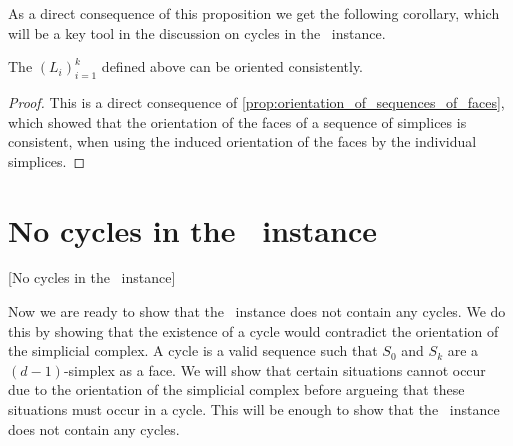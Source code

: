 As a direct consequence of this proposition we get the following corollary, which will be a key tool in the discussion on cycles in the \EndOfLine\ instance.

\begin{corollary}
    The $\left(L_i\right)_{i=1}^{k}$ defined above can be oriented consistently.
\end{corollary}
\begin{proof}
    This is a direct consequence of \cref{prop:orientation_of_sequences_of_faces}, which showed that the orientation of the faces of a sequence of simplices is consistent, when using the induced orientation of the faces by the individual simplices.
\end{proof}

\section{No cycles in the \EndOfLine\ instance}[No cycles in the \EndOfLine\ instance]

Now we are ready to show that the \EndOfLine\ instance does not contain any cycles. We do this by showing that the existence of a cycle would contradict the orientation of the simplicial complex. A cycle is a valid sequence such that $S_0$ and $S_k$ are a $(d-1)$-simplex as a face. We will show that certain situations cannot occur due to the orientation of the simplicial complex before argueing that these situations must occur in a cycle. This will be enough to show that the \EndOfLine\ instance does not contain any cycles.

